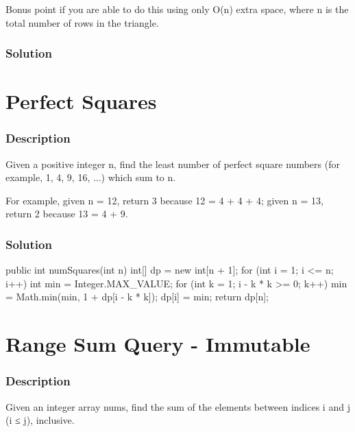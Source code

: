 Bonus point if you are able to do this using only O(n) extra space, where n is the total number of rows in the triangle.

\subsubsection{Solution}

\begin{Code}

\end{Code}

\newpage

\section{Perfect Squares} %

\subsubsection{Description}
Given a positive integer n, find the least number of perfect square numbers (for example, 1, 4, 9, 16, ...) which sum to n.

For example, given n = 12, return 3 because 12 = 4 + 4 + 4; given n = 13, return 2 because 13 = 4 + 9.

\subsubsection{Solution}

\begin{Code}
public int numSquares(int n) {
    int[] dp = new int[n + 1];
    for (int i = 1; i <= n; i++) {
        int min = Integer.MAX_VALUE;
        for (int k = 1; i - k * k >= 0; k++) {
            min = Math.min(min, 1 + dp[i - k * k]);
        }
        dp[i] = min;
    }
    return dp[n];
}
\end{Code}

\newpage

\section{Range Sum Query - Immutable} %

\subsubsection{Description}

Given an integer array nums, find the sum of the elements between indices i and j (i ≤ j), inclusive.


